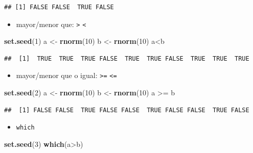 \documentclass[]{article}
\def\tightlist{}
\newenvironment{Shaded}{\begin{snugshade}}{\end{snugshade}}
\newcommand{\KeywordTok}[1]{\textcolor[rgb]{0.13,0.29,0.53}{\textbf{{#1}}}}
\newcommand{\DecValTok}[1]{\textcolor[rgb]{0.00,0.00,0.81}{{#1}}}
\newcommand{\StringTok}[1]{\textcolor[rgb]{0.31,0.60,0.02}{{#1}}}
\newcommand{\NormalTok}[1]{{#1}}
\numberwithin{equation}{section}
\begin{document}
\begin{verbatim}
## [1] FALSE FALSE  TRUE FALSE
\end{verbatim}

\begin{itemize}
\tightlist
\item
  mayor/menor que: \texttt{\textgreater{}} \texttt{\textless{}}
\end{itemize}

\begin{Shaded}
\begin{Highlighting}[]
\KeywordTok{set.seed}\NormalTok{(}\DecValTok{1}\NormalTok{)}
\NormalTok{a <-}\StringTok{ }\KeywordTok{rnorm}\NormalTok{(}\DecValTok{10}\NormalTok{)}
\NormalTok{b <-}\StringTok{ }\KeywordTok{rnorm}\NormalTok{(}\DecValTok{10}\NormalTok{)}
\NormalTok{a<b}
\end{Highlighting}
\end{Shaded}

\begin{verbatim}
##  [1]  TRUE  TRUE  TRUE FALSE  TRUE  TRUE FALSE  TRUE  TRUE  TRUE
\end{verbatim}

\begin{itemize}
\tightlist
\item
  mayor/menor que o igual: \texttt{\textgreater{}=}
  \texttt{\textless{}=}
\end{itemize}

\begin{Shaded}
\begin{Highlighting}[]
\KeywordTok{set.seed}\NormalTok{(}\DecValTok{2}\NormalTok{)}
\NormalTok{a <-}\StringTok{ }\KeywordTok{rnorm}\NormalTok{(}\DecValTok{10}\NormalTok{)}
\NormalTok{b <-}\StringTok{ }\KeywordTok{rnorm}\NormalTok{(}\DecValTok{10}\NormalTok{)}
\NormalTok{a >=}\StringTok{ }\NormalTok{b}
\end{Highlighting}
\end{Shaded}

\begin{verbatim}
##  [1] FALSE FALSE  TRUE FALSE FALSE  TRUE FALSE FALSE  TRUE FALSE
\end{verbatim}

\begin{itemize}
\tightlist
\item
  \texttt{which}
\end{itemize}

\begin{Shaded}
\begin{Highlighting}[]
\KeywordTok{set.seed}\NormalTok{(}\DecValTok{3}\NormalTok{)}
\KeywordTok{which}\NormalTok{(a>b)}
\end{Highlighting}
\end{Shaded}
\end{document}
